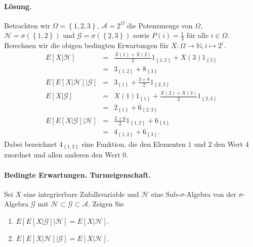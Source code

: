 \paragraph*{Lösung. } 
Betrachten wir $\Omega=\left\{ 1,2,3 \right\}$, $\mathcal A=2^\Omega$ die Potenzmenge von $\Omega$,
$\mathcal H=\sigma\left( \left\{ 1,2 \right\} \right)$ und 
$\mathcal G=\sigma\left( \left\{ 2,3 \right\} \right)$ sowie 
$P\left( i \right)=\frac{1}{3}$ für alle $i\in\Omega$. Berechnen wir die obigen bedingten
Erwartungen für $X:\Omega\to\mathbb N, i\mapsto 2^i$.
\begin{eqnarray*}
	E\left[ X|\mathcal H \right] &=&
	\frac{X\left( 1 \right)+X\left( 2 \right)}{2}1_{\left\{ 1,2 \right\}} + X\left( 3 \right) 1_{ \left\{ 3 \right\} } \\
	&=& 3_{  \left\{ 1,2 \right\} } + 8_{ \left\{ 3 \right\}  } \\ 
	E\left[ E\left[ X|\mathcal H \right]|\mathcal G \right] 
	&=& 3_{ \left\{ 1 \right\} } + \frac{3+8}{2} 1_{ \left\{ 2,3 \right\} } \\
	E\left[ X|\mathcal G \right] &=& 
	X\left( 1 \right) 1_{ \left\{ 1 \right\} } + \frac{X\left( 2 \right)+X\left( 3 \right)}{2}1_{ \left\{ 2,3 \right\} } \\
	&=& 2_{ \left\{ 1 \right\} } + 6_{ \left\{ 2,3 \right\} } \\
	E\left[ E\left[ X|\mathcal G \right]| \mathcal H \right] 
	&=& \frac{2+6}{2}1_{ \left\{ 1,2 \right\} } + 6_{ \left\{ 3 \right\} } \\
	&=& 4_{ \left\{ 1,2 \right\} } + 6_{ \left\{ 3 \right\} }.
\end{eqnarray*}
Dabei bezeichnet $4_{ \left\{ 1,2 \right\} }$ eine Funktion, die den Elementen $1$ und $2$
den Wert $4$ zuordnet und allen anderen den Wert $0$.


\paragraph{Bedingte Erwartungen. Turmeigenschaft. } Sei $X$ eine integrierbare
Zufallsvariable und $\mathcal H$ eine Sub-$\sigma$-Algebra von der
$\sigma$-Algebra $\mathcal G$ mit $\mathcal H \subset \mathcal G \subset
\mathcal A$. Zeigen Sie
\begin{enumerate}
    \item $E\left[ E\left[ X | \mathcal G \right] | \mathcal H \right] =
        E \left[ X | \mathcal H \right]$.
    \item $E\left[ E\left[ X | \mathcal H \right] | \mathcal G \right] =
        E \left[ X | \mathcal H \right]$.
\end{enumerate}

